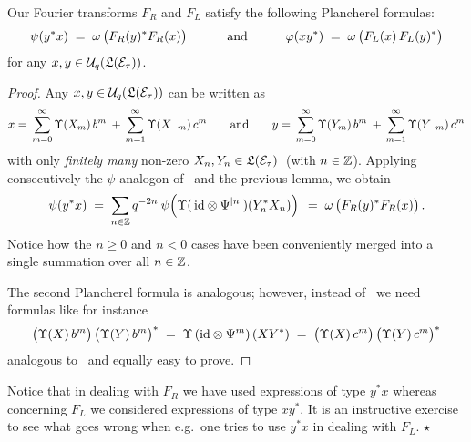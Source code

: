 \begin{thm} \label{thm:Eq2:Plancherel}
Our Fourier transforms $F_R$ and $F_L$ satisfy the following Plancherel formulas:
$$  \psi(y^* x)    \; = \; \omega\left(\vertM F_R(y)^* F_R(x) \right)
                \andspace{3em}
    \varphi(x y^*) \; = \; \omega\left(\vertM F_L(x) \, F_L(y)^* \right) $$
for any $x,y\in \Uq\!\left(\calL(\Hcore_\tau)\right)$.
\end{thm}
\begin{proof}
Any $x,y\in \Uq\!\left(\calL(\Hcore_\tau)\right)$ can be written as
$$  x =\, \sum_{m=0}^\infty \Upsilon(X_m)\, b^m \:+\,
          \sum_{m=1}^\infty \Upsilon(X_{-m})\, c^m
                    \andspace{2em}
    y =\, \sum_{m=0}^\infty \Upsilon(Y_m)\, b^m \:+\,
          \sum_{m=1}^\infty \Upsilon(Y_{-m})\, c^m        $$
with only {\em finitely many\/} non-zero $X_n, Y_n \in \calL(\Hcore_\tau)\:$ (with $n\in \ZZ$).
Applying consecutively the $\psi$-analogon of \mbox{\cite[corollary 3.4.2.2]{Jeroen:QE2:haar}}\
and the previous lemma, we obtain
$$ \psi(y^* x) \;=\; \sum_{n\in\ZZ}  q^{-2n} \: \psi \!
          \left(\Upsilon(\,\id \tens \Psi^{|n|})(Y_n^* X_n) \vertL\right)   \\
\;=\; \omega\left(\vertM F_R(y)^* F_R(x) \right).  $$
Notice how the $n\geq 0$ and $n<0$ cases have been conveniently merged into a
single summation over all $n\in\ZZ$.

The second Plancherel formula is analogous; however, instead of
\mbox{\cite[lemma 3.4.2.1]{Jeroen:QE2:haar}}\ we need formulas like for instance
$$\left(\Upsilon(X)\, b^m  \vertM\right)
          \left(\Upsilon(Y)\, b^m  \vertM\right)^*
    \;=\; \Upsilon\left(\id \tens \Psi^m \right)(X Y^*)
    \;=\; \left(\Upsilon(X)\, c^m  \vertM\right)
          \left(\Upsilon(Y)\, c^m  \vertM\right)^*  $$
analogous to \mbox{\cite[lemma 3.4.2.1 \&\ corollary 3.4.2.2]{Jeroen:QE2:haar}}\
and equally easy to prove.
\end{proof}


\begin{remark}  \rm
Notice that in dealing with $F_R$ we have used expressions of type
$y^*x$ whereas concerning $F_L$ we considered expressions of type
$x y^*$. It is an instructive exercise to see what goes wrong
when e.g.\ one tries to use $y^*x$ in dealing with $F_L$.
\hfill $\star$
\end{remark}
